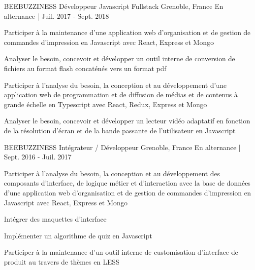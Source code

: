 

\begin{cventries}

  \cventry
  	{BEEBUZZINESS} %
    {Développeur Javascript Fullstack} %
    {Grenoble, France} %
    {En alternance | Juil. 2017 - Sept. 2018} %
    {
      \begin{cvitems} %
        \item {Participer à la maintenance d’une application web d'organisation et de gestion de commandes d'impression en Javascript avec React, Express et Mongo}
        \item {Analyser le besoin, concevoir et développer un outil interne de conversion de fichiers au format flash concaténés vers un format pdf}
        \item {Participer à l’analyse du besoin, la conception et au développement d’une application web de programmation et de diffusion de médias et de contenus à grande échelle en Typescript avec React, Redux, Express et Mongo}
        \item {Analyser le besoin, concevoir et développer un lecteur vidéo adaptatif en fonction de la résolution d'écran et de la bande passante de l'utilisateur en Javascript}
      \end{cvitems}
    }

  \cventry
  	{BEEBUZZINESS} %
    {Intégrateur / Développeur} %
    {Grenoble, France} %
    {En alternance | Sept. 2016 - Juil. 2017} %
    {
      \begin{cvitems} %
        \item {Participer à l’analyse du besoin, la conception et au développement des composants d’interface, de logique métier et d’interaction avec la base de données d'une application web d'organisation et de gestion de commandes d'impression en Javascript avec React, Express et Mongo}
        \item {Intégrer des maquettes d’interface}
        \item {Implémenter un algorithme de quiz en Javascript}
        \item {Participer à la maintenance d’un outil interne de customisation d’interface de produit au travers de thèmes en LESS}
      \end{cvitems}
    }

\end{cventries}
